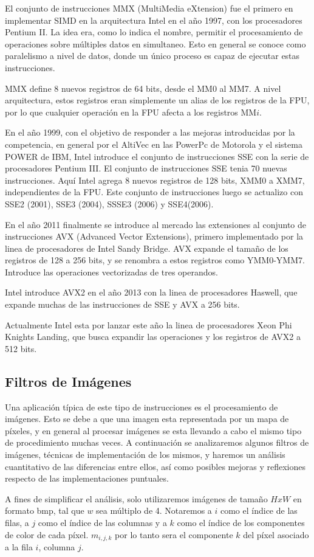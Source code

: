 El conjunto de instrucciones MMX (MultiMedia eXtension) fue el primero en implementar SIMD en la arquitectura Intel en el año 1997, con los procesadores Pentium II. La idea era, como lo indica el nombre, permitir el procesamiento de operaciones sobre múltiples datos en simultaneo. Esto en general se conoce como paralelismo a nivel de datos, donde un único proceso es capaz de ejecutar estas instrucciones.

MMX define 8 nuevos registros de 64 bits, desde el MM0 al MM7. A nivel arquitectura, estos registros eran simplemente un alias de los registros de la FPU, por lo que cualquier operación en la FPU afecta a los registros MM$i$.

En el año 1999, con el objetivo de responder a las mejoras introducidas por la competencia, en general por el AltiVec en las PowerPc de Motorola y el sistema POWER de IBM, Intel introduce el conjunto de instrucciones SSE con la serie de procesadores Pentium III. El conjunto de instrucciones SSE tenia 70 nuevas instrucciones. Aquí Intel agrega 8 nuevos registros de 128 bits, XMM0 a XMM7, independientes de la FPU. Este conjunto de instrucciones luego se actualizo con SSE2 (2001), SSE3 (2004), SSSE3 (2006) y SSE4(2006).

En el año 2011 finalmente se introduce al mercado las extensiones al conjunto de instrucciones AVX (Advanced Vector Extensions), primero implementado por la linea de procesadores de Intel Sandy Bridge. AVX expande el tamaño de los registros de 128 a 256 bits, y se renombra a estos registros como YMM0-YMM7. Introduce las operaciones vectorizadas de tres operandos. 

Intel introduce AVX2 en el año 2013 con la linea de procesadores Haswell, que expande muchas de las instrucciones de SSE y AVX a 256 bits.

Actualmente Intel esta por lanzar este año la linea de procesadores Xeon Phi Knights Landing, que busca expandir las operaciones y los registros de AVX2 a 512 bits.

\subsection{Filtros de Imágenes}

Una aplicación típica de este tipo de instrucciones es el procesamiento de imágenes. Esto se debe a que una imagen esta representada por un mapa de píxeles, y en general al procesar imágenes se esta llevando a cabo el mismo tipo de procedimiento muchas veces. A continuación se analizaremos algunos filtros de imágenes, técnicas de implementación de los mismos, y haremos un análisis cuantitativo de las diferencias entre ellos, así como posibles mejoras y reflexiones respecto de las implementaciones puntuales.

A fines de simplificar el análisis, solo utilizaremos imágenes de tamaño $HxW$ en formato bmp, tal que $w$ sea múltiplo de 4. Notaremos a $i$ como el índice de las filas, a $j$ como el índice de las columnas y a $k$ como el índice de los componentes de color de cada píxel. $m_{i, j, k}$ por lo tanto sera el componente $k$ del píxel asociado a la fila $i$, columna $j$.
